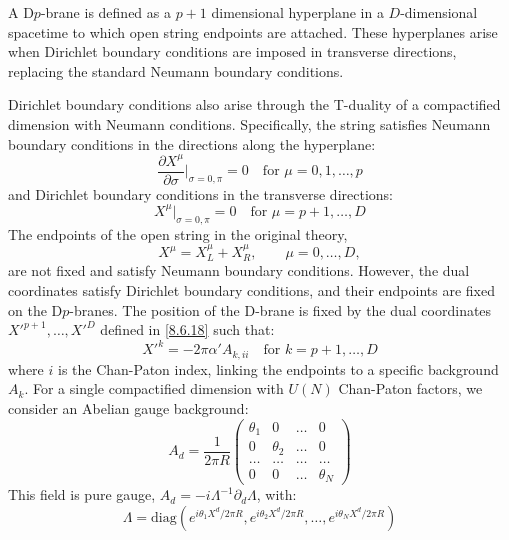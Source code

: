 \begin{tcolorbox}[breakable]
			A D$p$-brane is defined as a $p+1$ dimensional hyperplane in a $D$-dimensional spacetime to which open string endpoints are attached. These hyperplanes arise when Dirichlet boundary conditions are imposed in transverse directions, replacing the standard Neumann boundary conditions. 
			
				Dirichlet boundary conditions also arise through the T-duality of a compactified dimension with Neumann conditions. Specifically, the string satisfies Neumann boundary conditions in the directions along the hyperplane:
				\begin{equation}
					\frac{\partial X^\mu}{\partial \sigma} \Big|_{\sigma=0,\pi} = 0 \quad \text{for } \mu = 0, 1, \dots, p 
				\end{equation}
				and Dirichlet boundary conditions in the transverse directions:
				\begin{equation}
					X^\mu \Big|_{\sigma=0,\pi} = 0 \quad \text{for } \mu = p+1, \dots, D
				\end{equation}
				The endpoints of the open string in the original theory,
				\[
				X^\mu = X_L^\mu + X_R^\mu, \qquad \mu = 0, \ldots, D,
				\]
				are not fixed and satisfy Neumann boundary conditions. 
				However, the dual coordinates satisfy Dirichlet boundary conditions, and their endpoints are fixed on the D$p$-branes. The position of the D-brane is fixed by the dual coordinates $X'^{p+1}, \dots, X'^D$ defined in \eqref{8.6.18} such that:
				\begin{equation}
					X'^k = -2\pi \alpha' A_{k,ii} \quad \text{for } k = p+1, \dots, D
				\end{equation}
				where $i$ is the Chan-Paton index, linking the endpoints to a specific background $A_k$. For a single compactified dimension with $U(N)$ Chan-Paton factors, we consider an Abelian gauge background:
				\begin{equation}
					A_d = \frac{1}{2\pi R} \begin{pmatrix} \theta_1 & 0 & \dots & 0 \\ 0 & \theta_2 & \dots & 0 \\ \dots & \dots & \dots & \dots \\ 0 & 0 & \dots & \theta_N \end{pmatrix} 
				\end{equation}
				This field is pure gauge, $A_d = -i \Lambda^{-1} \partial_d \Lambda$, with:
				\begin{equation}
					\Lambda = \text{diag}(e^{i\theta_1 X^d / 2\pi R}, e^{i\theta_2 X^d / 2\pi R}, \dots, e^{i\theta_N X^d / 2\pi R}) 

\end{equation}
\end{tcolorbox}
